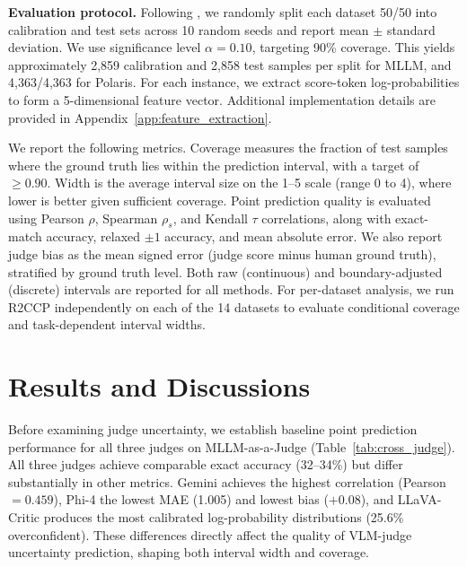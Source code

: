 \documentclass{article}
\begin{document}
\textbf{Evaluation protocol.}
Following \citet{sheng2025analyzing}, we randomly split each dataset 50/50 into calibration and test sets across 10 random seeds and report mean $\pm$ standard deviation. We use significance level $\alpha = 0.10$, targeting 90\% coverage. This yields approximately 2,859 calibration and 2,858 test samples per split for MLLM, and 4,363/4,363 for Polaris. For each instance, we extract score-token log-probabilities to form a 5-dimensional feature vector. Additional implementation details are provided in Appendix~\ref{app:feature_extraction}.

We report the following metrics. Coverage measures the fraction of test samples where the ground truth lies within the prediction interval, with a target of $\geq 0.90$. Width is the average interval size on the 1--5 scale (range 0 to 4), where lower is better given sufficient coverage. Point prediction quality is evaluated using Pearson $\rho$, Spearman $\rho_s$, and Kendall $\tau$ correlations, along with exact-match accuracy, relaxed $\pm 1$ accuracy, and mean absolute error. We also report judge bias as the mean signed error (judge score minus human ground truth), stratified by ground truth level. Both raw (continuous) and boundary-adjusted (discrete) intervals are reported for all methods. For per-dataset analysis, we run R2CCP independently on each of the 14 datasets to evaluate conditional coverage and task-dependent interval widths.

\section{Results and Discussions}

Before examining judge uncertainty, we establish baseline point prediction performance for all three judges on MLLM-as-a-Judge (Table~\ref{tab:cross_judge}). All three judges achieve comparable exact accuracy (32--34\%) but differ substantially in other metrics. Gemini achieves the highest correlation (Pearson $= 0.459$), Phi-4 the lowest MAE (1.005) and lowest bias ($+0.08$), and LLaVA-Critic produces the most calibrated log-probability distributions (25.6\% overconfident). These differences directly affect the quality of VLM-judge uncertainty prediction, shaping both interval width and coverage.
\end{document}
